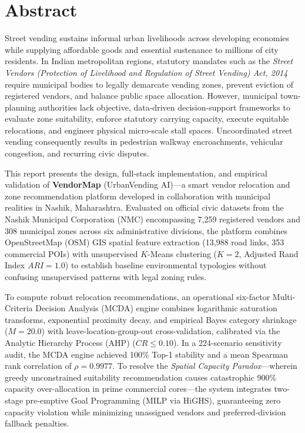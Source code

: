 \chapter*{Abstract}
\label{ch:abstract}

Street vending sustains informal urban livelihoods across developing economies while supplying affordable goods and essential sustenance to millions of city residents. In Indian metropolitan regions, statutory mandates such as the \textit{Street Vendors (Protection of Livelihood and Regulation of Street Vending) Act, 2014} require municipal bodies to legally demarcate vending zones, prevent eviction of registered vendors, and balance public space allocation. However, municipal town-planning authorities lack objective, data-driven decision-support frameworks to evaluate zone suitability, enforce statutory carrying capacity, execute equitable relocations, and engineer physical micro-scale stall spaces. Uncoordinated street vending consequently results in pedestrian walkway encroachments, vehicular congestion, and recurring civic disputes.

This report presents the design, full-stack implementation, and empirical validation of \textbf{VendorMap} (UrbanVending AI)---a smart vendor relocation and zone recommendation platform developed in collaboration with municipal realities in Nashik, Maharashtra. Evaluated on official civic datasets from the Nashik Municipal Corporation (NMC) encompassing 7,259 registered vendors and 308 municipal zones across six administrative divisions, the platform combines OpenStreetMap (OSM) GIS spatial feature extraction (13,988 road links, 353 commercial POIs) with unsupervised $K$-Means clustering ($K=2$, Adjusted Rand Index $ARI = 1.0$) to establish baseline environmental typologies without confusing unsupervised patterns with legal zoning rules.

To compute robust relocation recommendations, an operational six-factor Multi-Criteria Decision Analysis (MCDA) engine combines logarithmic saturation transforms, exponential proximity decay, and empirical Bayes category shrinkage ($M=20.0$) with leave-location-group-out cross-validation, calibrated via the Analytic Hierarchy Process (AHP) ($CR \le 0.10$). In a 224-scenario sensitivity audit, the MCDA engine achieved 100\% Top-1 stability and a mean Spearman rank correlation of $\rho = 0.9977$. To resolve the \textit{Spatial Capacity Paradox}---wherein greedy unconstrained suitability recommendation causes catastrophic 900\% capacity over-allocation in prime commercial cores---the system integrates two-stage pre-emptive Goal Programming (MILP via HiGHS), guaranteeing zero capacity violation while minimizing unassigned vendors and preferred-division fallback penalties.

